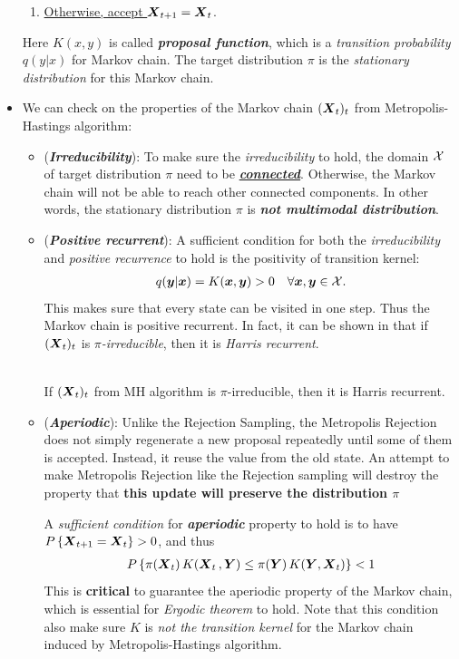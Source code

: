 \documentclass[11pt]{article}
\begin{document}
\begin{itemize}
\begin{enumerate}
\item \underline{Otherwise, accept $\boldsymbol{X}_{t+1} = \boldsymbol{X}_{t}$}.
\end{enumerate} Here $K(x, y)$ is called \emph{\textbf{proposal function}}, which is a \emph{transition probability} $q(y|x)$ for Markov chain. The target distribution $\pi$ is the \emph{stationary distribution} for this Markov chain.

\item We can check on the properties of the Markov chain $(\boldsymbol{X}_t)_t$ from Metropolis-Hastings algorithm:
\begin{itemize}
\item (\textbf{\emph{Irreducibility}}): To make sure the \emph{irreducibility} to hold, the domain ${\mathcal X}$ of target distribution $\pi$ need to be \underline{\emph{\textbf{connected}}}. Otherwise, the Markov chain will not be able to reach other connected components. In other words, the stationary distribution $\pi$ is \textbf{\emph{not multimodal distribution}}.

\item (\textbf{\emph{Positive recurrent}}): A sufficient condition for both the \emph{irreducibility} and \emph{positive recurrence} to hold is the positivity of transition kernel:
\begin{align}
q(\boldsymbol{y}| \boldsymbol{x}) = K(\boldsymbol{x}, \boldsymbol{y}) > 0 \quad \forall \boldsymbol{x}, \boldsymbol{y} \in {\mathcal X}. \label{eqn: mh_positive}
\end{align} This makes sure that every state can be visited in one step. Thus the Markov chain is positive recurrent. In fact, it can be shown in \citep{robert1999monte} that if $(\boldsymbol{X}_t)_t$ is \emph{$\pi$-irreducible}, then it is \emph{Harris recurrent}.
\begin{lemma} \citep{robert1999monte}\\
If $(\boldsymbol{X}_t)_t$ from MH algorithm is $\pi$-irreducible, then it is Harris recurrent.
\end{lemma}


\item (\textbf{\emph{Aperiodic}}): Unlike the Rejection Sampling, the Metropolis Rejection does not simply regenerate a new proposal repeatedly until some of them is accepted. Instead, it reuse the value from the old state. An attempt to make Metropolis Rejection like the Rejection sampling will destroy the property that \textbf{this update will preserve the distribution $\pi$}

A \emph{sufficient condition} for \emph{\textbf{aperiodic}} property to hold is to have $P\left\{\boldsymbol{X}_{t+1} = \boldsymbol{X}_{t}\right\} > 0$, and thus
\begin{align}
P\left\{\pi(\boldsymbol{X}_t)\,K(\boldsymbol{X}_t\,, \boldsymbol{Y}) \le  \pi(\boldsymbol{Y})\,K(\boldsymbol{Y}, \boldsymbol{X}_t)\right\} < 1 \label{eqn: mh_aperiod}
\end{align} This is \textbf{critical} to guarantee the aperiodic property of the Markov chain, which is essential for \emph{Ergodic theorem} to hold. Note that this condition also make sure $K$ is \emph{not the transition kernel} for the Markov chain induced by Metropolis-Hastings algorithm.


\end{itemize}
\end{itemize}
\end{document}
